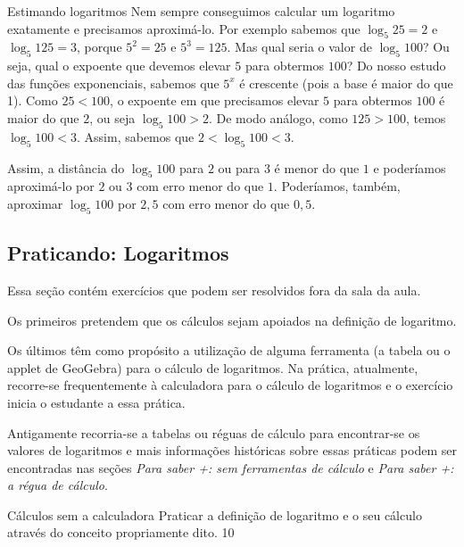 \begin{example}{Estimando logaritmos}
Nem sempre conseguimos calcular um logaritmo exatamente e precisamos aproximá-lo. Por exemplo sabemos que $\log_5 25 = 2$ e $\log_5 125 = 3$, porque $5^2=25$ e $5^3 = 125$. Mas qual seria o valor de $\log_5 100$? Ou seja, qual o expoente que devemos elevar $5$ para obtermos $100$? Do nosso estudo das funções exponenciais, sabemos que $5^x$ é crescente (pois a base é maior do que 1). Como $25 < 100$, o expoente em que precisamos elevar $5$ para obtermos $100$ é maior do que $2$, ou seja $\log_5 100 >2$. De modo análogo, como $125 > 100$, temos $\log_5 100<3$. Assim, sabemos que $2<\log_5 100<3$.

\begin{figure}[H]
\centering

\end{figure}

Assim, a distância do $\log_5 100$ para $2$ ou para $3$ é menor do que $1$ e poderíamos aproximá-lo por $2$ ou $3$ com erro menor do que $1$. Poderíamos, também, aproximar $\log_5 100$ por $2{,}5$ com erro menor do que $0{,}5$. 
\end{example}


\def\currentcolor{session2}
\begin{texto}
{\section{Praticando: Logaritmos}

Essa seção contém exercícios que podem ser resolvidos fora da sala da aula.

Os primeiros pretendem que os cálculos sejam apoiados na definição de logaritmo.

Os últimos têm como propósito a utilização de alguma ferramenta (a tabela ou o applet de GeoGebra) para o cálculo de logaritmos. Na prática, atualmente, recorre-se frequentemente à calculadora para o cálculo de logaritmos e o exercício inicia o estudante a essa prática.

Antigamente recorria-se a tabelas ou réguas de cálculo para encontrar-se os valores de logaritmos e mais informações históricas sobre essas práticas podem ser encontradas nas seções \textit{Para saber +: sem ferramentas de cálculo} e \textit{Para saber +: a régua de cálculo}.
}
\end{texto}
\begin{objectives}{Cálculos sem a calculadora}
{
Praticar a definição de logaritmo e o seu cálculo através do conceito propriamente dito.
}{1}{0}
\end{objectives}

